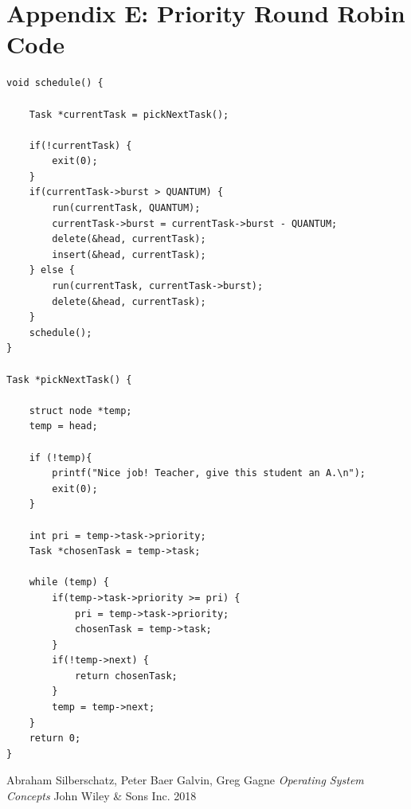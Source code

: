 \documentclass[10pt]{article}
\begin{document}
\pagebreak
\section{Appendix E: Priority Round Robin Code}
\begin{verbatim}
void schedule() {

    Task *currentTask = pickNextTask();
    
    if(!currentTask) {
        exit(0);
    }
    if(currentTask->burst > QUANTUM) {
        run(currentTask, QUANTUM);
        currentTask->burst = currentTask->burst - QUANTUM;
        delete(&head, currentTask);
        insert(&head, currentTask);
    } else {
        run(currentTask, currentTask->burst);
        delete(&head, currentTask);
    }
    schedule();
}

Task *pickNextTask() {
    
    struct node *temp;
    temp = head;

    if (!temp){
        printf("Nice job! Teacher, give this student an A.\n");
        exit(0);
    }

    int pri = temp->task->priority;
    Task *chosenTask = temp->task;

    while (temp) {
        if(temp->task->priority >= pri) {
            pri = temp->task->priority;
            chosenTask = temp->task;
        }
        if(!temp->next) {
            return chosenTask;
        }
        temp = temp->next;
    }
    return 0;
}
\end{verbatim}

\pagebreak
\begin{thebibliography}{9}
Abraham Silberschatz, Peter Baer Galvin, Greg Gagne
\textit{Operating System Concepts}
John Wiley \& Sons Inc. 2018
\end{thebibliography}
\end{document}
